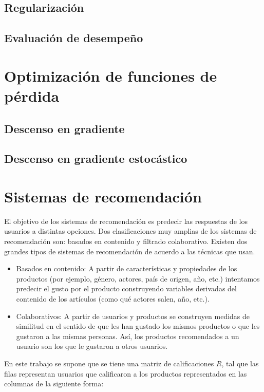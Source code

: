 \subsection{Regularización}

\subsection{Evaluación de desempeño}

\section{Optimización de funciones de pérdida}

\subsection{Descenso en gradiente}

\subsection{Descenso en gradiente estocástico}

\section{Sistemas de recomendación}

El objetivo de los sistemas de recomendación es predecir las respuestas de los usuarios a distintas opciones. Dos clasificaciones muy amplias de los sistemas de recomendación son: basados en contenido y filtrado colaborativo. Existen dos grandes tipos de sistemas de recomendación de acuerdo a las técnicas que usan.

\begin{itemize}
\item Basados en contenido: A partir de características y propiedades de los productos (por ejemplo, género, actores, país de origen, año, etc.) intentamos predecir el gusto por el producto construyendo variables derivadas del contenido de los artículos (como qué actores salen, año, etc.).
\item Colaborativos: A partir de usuarios y productos se construyen medidas de similitud en el sentido de que les han gustado los mismos productos o que les gustaron a las mismas personas. Así, los productos recomendados a un usuario son los que le gustaron a otros usuarios.
\end{itemize}

En este trabajo se supone que se tiene una matriz de calificaciones $R$, tal que las filas representan usuarios que calificaron a los productos representados en las columnas de la siguiente forma:

